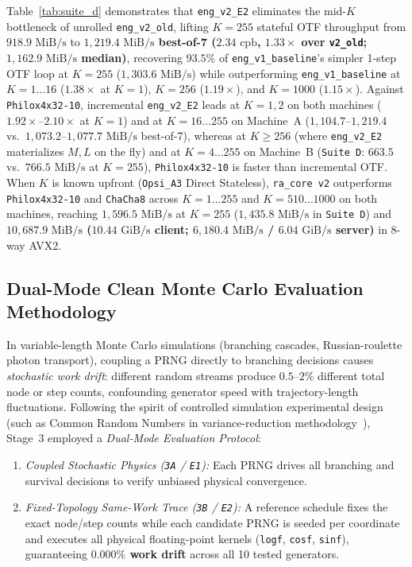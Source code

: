 \documentclass[conference]{IEEEtran}
\begin{document}
Table~\ref{tab:suite_d} demonstrates that \texttt{eng\_v2\_E2} eliminates the mid-$K$ bottleneck of unrolled \texttt{eng\_v2\_old}, lifting $K=255$ stateful OTF throughput from $918.9\text{ MiB/s}$ to \textbf{$1{,}219.4\text{ MiB/s}$ best-of-7 ($2.34\text{ cpb}$, $1.33\times$ over \texttt{v2\_old}; $1{,}162.9\text{ MiB/s}$ median)}, recovering $93.5\%$ of \texttt{eng\_v1\_baseline}'s simpler 1-step OTF loop at $K=255$ ($1{,}303.6\text{ MiB/s}$) while outperforming \texttt{eng\_v1\_baseline} at $K=1\ldots 16$ ($1.38\times$ at $K=1$), $K=256$ ($1.19\times$), and $K=1000$ ($1.15\times$). Against \texttt{Philox4x32-10}, incremental \texttt{eng\_v2\_E2} leads at $K=1,2$ on both machines ($1.92\times$--$2.10\times$ at $K=1$) and at $K=16\ldots 255$ on Machine~A ($1{,}104.7$--$1{,}219.4$ vs.\ $1{,}073.2$--$1{,}077.7\text{ MiB/s}$ best-of-7), whereas at $K \ge 256$ (where \texttt{eng\_v2\_E2} materializes $M, L$ on the fly) and at $K=4\ldots 255$ on Machine~B (\texttt{Suite~D}: $663.5$ vs.\ $766.5\text{ MiB/s}$ at $K=255$), \texttt{Philox4x32-10} is faster than incremental OTF. When $K$ is known upfront (\texttt{Opsi\_A3} Direct Stateless), \texttt{ra\_core v2} outperforms \texttt{Philox4x32-10} and \texttt{ChaCha8} across $K=1\ldots 255$ and $K=510\ldots 1000$ on both machines, reaching \textbf{$1{,}596.5\text{ MiB/s}$} at $K=255$ ($1{,}435.8\text{ MiB/s}$ in \texttt{Suite~D}) and \textbf{$10{,}687.9\text{ MiB/s}$ ($10.44\text{ GiB/s}$ client; $6{,}180.4\text{ MiB/s}$ / $6.04\text{ GiB/s}$ server)} in 8-way AVX2.

\subsection{Dual-Mode Clean Monte Carlo Evaluation Methodology}

In variable-length Monte Carlo simulations (branching cascades, Russian-roulette photon transport), coupling a PRNG directly to branching decisions causes \emph{stochastic work drift}: different random streams produce $0.5$--$2\%$ different total node or step counts, confounding generator speed with trajectory-length fluctuations. Following the spirit of controlled simulation experimental design (such as Common Random Numbers in variance-reduction methodology~\cite{law2015simulation}), Stage~3 employed a \emph{Dual-Mode Evaluation Protocol}:
\begin{enumerate}
    \item \emph{Coupled Stochastic Physics (\texttt{3A} / \texttt{E1}):} Each PRNG drives all branching and survival decisions to verify unbiased physical convergence.
    \item \emph{Fixed-Topology Same-Work Trace (\texttt{3B} / \texttt{E2}):} A reference schedule fixes the exact node/step counts while each candidate PRNG is seeded per coordinate and executes all physical floating-point kernels (\texttt{logf}, \texttt{cosf}, \texttt{sinf}), guaranteeing \textbf{$0.000\%$ work drift} across all 10 tested generators.
\end{enumerate}
\end{document}

